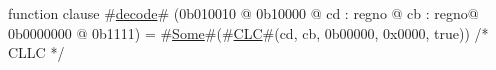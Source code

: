 function clause #\hyperref[zdecode]{decode}# (0b010010 @ 0b10000 @ cd : regno @ cb : regno@ 0b0000000 @ 0b1111) = #\hyperref[zSome]{Some}#(#\hyperref[zCLC]{CLC}#(cd, cb, 0b00000, 0x0000, true))                        /* CLLC */
